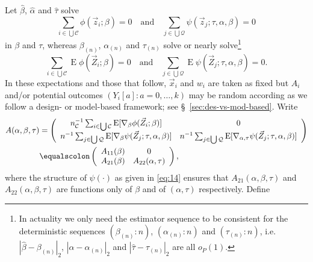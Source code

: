 \documentclass{article}
\newcommand{\eqdef}{\ensuremath{\equalscolon}}
\newcommand{\EE}{\operatorname{E}}
\begin{document}
Let $\hat\beta$, $\hat{\alpha}$ and $\hat\tau$ solve
\[\sum_{i\in \bigcup \mathcal{C}}\phi(\vec{z}_{i}; \beta )
  =0\quad\text{and}\quad
\sum_{j\in \bigcup \mathcal{Q}}\psi(\vec{z}_{j}; \tau,
\alpha, \beta )  =0
  \]
  in $\beta$ and $\tau$, whereas $\beta_{(n)}$, $\alpha_{(n)}$ and $\tau_{(n)}$ solve or nearly solve\footnote{%
In actuality we only need the estimator sequence to be consistent for the deterministic sequences $(\beta_{(n)}:n)$, $(\alpha_{(n)}:n)$ and $(\tau_{(n)}:n)$, i.e. $|\hat\beta - \beta_{(n)}|_{2}$, $|\hat\alpha - \alpha_{(n)}|_{2}$ and $|\hat\tau - \tau_{(n)}|_{2}$ are all $o_{P}(1)$.%
}
\[\sum_{i\in \bigcup \mathcal{C}}\EE\phi(\vec{Z}_{i}; \beta )
  =0\quad\text{and}\quad
\sum_{j\in \bigcup \mathcal{Q}}\EE\psi(\vec{Z}_{j}; \tau,
\alpha, \beta )  =0.
  \]
In these expectations and those that follow, $\vec{x}_{i}$ and $w_{i}$
are taken as fixed but $A_{i}$ and/or potential outcomes $(Y_{i}[a]:
a=0, \ldots, k)$ may be random according as we follow a design- or
model-based framework; see \S~\ref{sec:des-vs-mod-based}.
  Write
  \begin{align*}
    A(\alpha, \beta, \tau) &= \left(
      \begin{array}{cc}
        n_{\mathcal{C}}^{-1}\sum_{i\in \bigcup
        \mathcal{C}}\EE [\nabla_{\beta}\phi(\vec{Z}_{i};
        \beta )]&0\\
        n^{-1}\sum_{j\in \bigcup
        \mathcal{Q}}\EE[ \nabla_{\beta}\psi(\vec{Z}_{j};
        \tau, \alpha, \beta )]  & n^{-1}\sum_{j\in \bigcup
        \mathcal{Q}}\EE[ \nabla_{\alpha, \tau}\psi(\vec{Z}_{j};
        \tau, \alpha, \beta )]
      \end{array}
    \right)\\
    &\eqdef \left(
      \begin{array}{cc}
        A_{11}(\beta)& 0\\
        A_{21}(\beta) & A_{22}(\alpha, \tau)
      \end{array}
\right),
  \end{align*}
where the structure of $\psi(\cdot)$ as given in \eqref{eq:14} ensures
that $A_{21}(\alpha, \beta, \tau)$ and $A_{22}(\alpha, \beta, \tau)$ are functions only of $\beta$ and of $(\alpha, \tau)$ respectively. Define   
\end{document}
